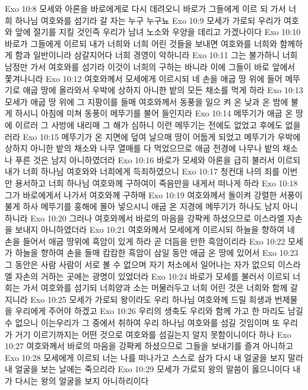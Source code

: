 Exo 10:8  모세와 아론을 바로에게로 다시 데려오니 바로가 그들에게 이르 되 가서 너희 하나님 여호와를 섬기라 갈 자는 누구 누구뇨
Exo 10:9  모세가 가로되 우리가 여호와 앞에 절기를 지킬 것인즉 우리가 남녀 노소와 우양을 데리고 가겠나이다
Exo 10:10  바로가 그들에게 이르되 내가 너희와 너희 어린 것들을 보내면 여호와를 너희와 함께하게 함과 일반이니라 삼갈지어다 너희 경영이 악하니라
Exo 10:11  그는 불가하니 너희 남정만 가서 여호와를 섬기라 이것이 너희의 구하는 바니라 이에 그들이 바로 앞에서 쫓겨나니라
Exo 10:12  여호와께서 모세에게 이르시되 네 손을 애굽 땅 위에 들어 메뚜기로 애굽 땅에 올라와서 우박에 상하지 아니한 밭의 모든 채소를 먹게 하라
Exo 10:13  모세가 애굽 땅 위에 그 지팡이를 들매 여호와께서 동풍을 일으 켜 온 낮과 온 밤에 불게 하시니 아침에 미쳐 동풍이 메뚜기를 불어 들인지라
Exo 10:14  메뚜기가 애굽 온 땅에 이르러 그 사방에 내리매 그 해가 심하니 이런 메뚜기는 전에도 없었고 후에도 없을러라
Exo 10:15  메뚜기가 온 지면에 덮여 날으매 땅이 어둡게 되었고 메뚜기가 우박에 상하지 아니한 밭의 채소와 나무 열매를 다 먹었으므로 애굽 전경에 나무나 밭의 채소나 푸른 것은 남지 아니하였더라
Exo 10:16  바로가 모세와 아론을 급히 불러서 이르되 내가 너희 하나님 여호와와 너희에게 득죄하였으니
Exo 10:17  청컨대 나의 죄를 이번만 용서하고 너희 하나님 여호와께 구하여이 죽음만을 내게서 떠나게 하라
Exo 10:18  그가 바로에게서 나가서 여호와께 구하매
Exo 10:19  여호와께서 돌이켜 강렬한 서풍이 불게 하사 메뚜기를 홍해에 몰아 넣으시니 애굽 온 지경에 메뚜기가 하나도 남지 아니하니라
Exo 10:20  그러나 여호와께서 바로의 마음을 강퍅케 하셨으므로 이스라엘 자손을 보내지 아니하였더라
Exo 10:21  여호와께서 모세에게 이르시되 하늘을 향하여 네 손을 들어서 애굽 땅위에 흑암이 있게 하라 곧 더듬을 만한 흑암이리라
Exo 10:22  모세가 하늘을 향하여 손을 들매 캄캄한 흑암이 삼일 동안 애굽 온 땅에 있어서
Exo 10:23  그 동안은 사람 사람이 서로 볼 수 없으며 자기 처소에서 일어나는 자가 없으되 이스라엘 자손의 거하는 곳에는 광명이 있었더라
Exo 10:24  바로가 모세를 불러서 이르되 너희는 가서 여호와를 섬기되 너희양과 소는 머물러두고 너희 어린 것은 너희와 함께 갈지니라
Exo 10:25  모세가 가로되 왕이라도 우리 하나님 여호와께 드릴 희생과 번제물을 우리에게 주어야 하겠고
Exo 10:26  우리의 생축도 우리와 함께 가고 한 마리도 남길 수 없으니 이는우리가 그 중에서 취하여 우리 하나님 여호와를 섬길 것임이며 또 우리가 거기 이르기까지는 어떤 것으로 여호와를 섬길는지 알지 못함이니이다 하나
Exo 10:27  여호와께서 바로의 마음을 강퍅케 하셨으므로 그들을 보내기를 즐겨 아니하고
Exo 10:28  모세에게 이르되 너는 나를 떠나가고 스스로 삼가 다시 내 얼굴을 보지 말라 내 얼굴을 보는 날에는 죽으리라
Exo 10:29  모세가 가로되 왕의 말씀이 옳으니이다 내가 다시는 왕의 얼굴을 보지 아니하리이다
